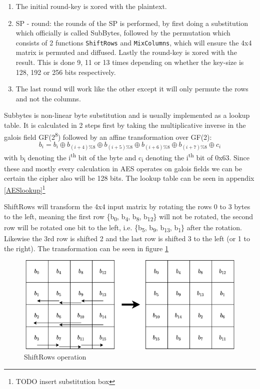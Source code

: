 \documentclass[a4paper]{article}
\begin{document}
\begin{enumerate}
\begin{enumerate}
\begin{center}
\end{center}

\item The initial round-key is xored with the plaintext.
\item SP - round: the rounds of the SP is performed, by first doing a substitution which officially is called SubBytes\cite{Rijndahl}, followed by the permutation which consists of 2 functions \texttt{ShiftRows} and \texttt{MixColumns}, which will ensure the 4x4 matrix is permuted and diffused. Lastly the round-key is xored with the result. This is done 9, 11 or 13 times depending on whether the key-size is 128, 192 or 256 bits respectively.
\item The last round will work like the other except it will only permute the rows and not the columns.
\end{enumerate}

Subbytes is non-linear byte substitution and is usually implemented as a lookup table. It is calculated in 2 steps first by taking the multiplicative inverse in the galois field GF(2\textsuperscript{8}) followed by an affine transformation over GF(2):
\[b_i = b_i \oplus b_{(i+4) \% 8} \oplus b_{(i+5) \% 8} \oplus b_{(i+6) \% 8} \oplus b_{(i+7) \% 8} \oplus c_i \] with b\textsubscript{i} denoting the i\textsuperscript{th} bit of the byte and c\textsubscript{i} denoting the i\textsuperscript{th} bit of 0x63. Since these and mostly every calculation in AES operates on galois fields we can be certain the cipher also will be 128 bits. The lookup table can be seen in appendix \ref{AESlookup}\footnote{TODO insert substitution box}

ShiftRows will transform the 4x4 input matrix by rotating the rows 0 to 3 bytes to the left, meaning the first row \{b\textsubscript{0}, b\textsubscript{4}, b\textsubscript{8}, b\textsubscript{12}\} will not be rotated, the second row will be rotated one bit to the left, i.e. \{b\textsubscript{5}, b\textsubscript{9}, b\textsubscript{13}, b\textsubscript{1}\} after the rotation. Likewise the 3rd row is shifted 2 and the last row is shifted 3 to the left (or 1 to the right). The transformation can be seen in figure \ref{fig:ShiftRows}


\begin{figure}[htbp]
\centering
\includegraphics[width=.9\linewidth]{./Background/shiftRows.png}
\caption{\label{fig:ShiftRows}ShiftRows operation}
\end{figure}


\end{enumerate}
\end{document}
